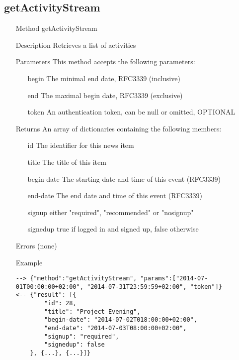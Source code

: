 \documentclass[a4paper]{scrreprt}
\begin{document}
\subsection{getActivityStream}
\begin{enumerate}
\item[Method] getActivityStream
\item[Description] Retrieves a list of activities
\item[Parameters] This method accepts the following parameters:
	\begin{enumerate}
		\item[begin] The minimal end date, RFC3339 (inclusive)
        \item[end] The maximal begin date, RFC3339 (exclusive) 
        \item[token] An authentication token, can be null or omitted, OPTIONAL
    \end{enumerate}
\item[Returns] An array of dictionaries containing the following members:
\begin{enumerate}
    \item[id] The identifier for this news item
    \item[title] The title of this item
    \item[begin-date] The starting date and time of this event (RFC3339)
    \item[end-date] The end date and time of this event (RFC3339)
    \item[signup] either "required", "recommended" or "nosignup"
    \item[signedup] true if logged in and signed up, false otherwise
	\end{enumerate}
\item[Errors] (none)
\item[Example]
\begin{lstlisting}
--> {"method":"getActivityStream", "params":["2014-07-01T00:00:00+02:00", "2014-07-31T23:59:59+02:00", "token"]}
<-- {"result": [{
        "id": 28,
        "title": "Project Evening", 
        "begin-date": "2014-07-02T018:00:00+02:00",
        "end-date": "2014-07-03T08:00:00+02:00",
        "signup": "required",
        "signedup": false
    }, {...}, {...}]}
\end{lstlisting}
\end{enumerate}

\clearpage
\end{document}
